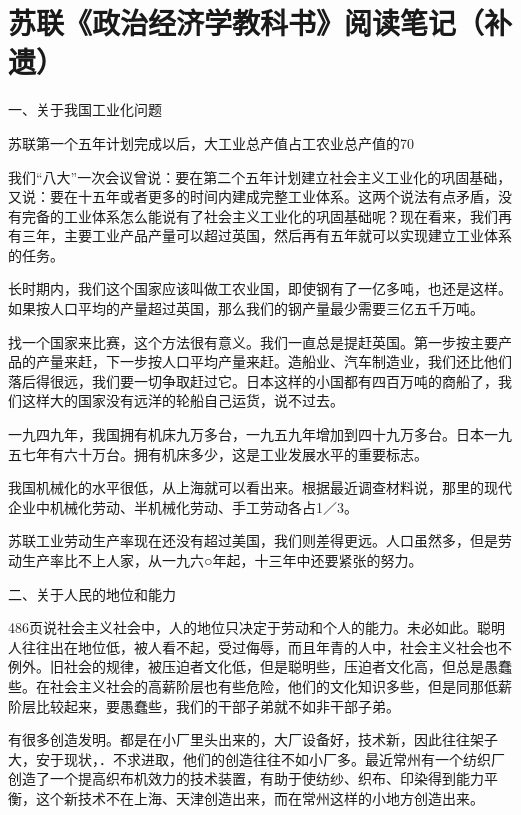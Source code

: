 \section[苏联《政治经济学教科书》阅读笔记（补遗）]{苏联《政治经济学教科书》阅读笔记（补遗）}


一、关于我国工业化问题

苏联第一个五年计划完成以后，大工业总产值占工农业总产值的70%

我们“八大”一次会议曾说：要在第二个五年计划建立社会主义工业化的巩固基础，又说：要在十五年或者更多的时间内建成完整工业体系。这两个说法有点矛盾，没有完备的工业体系怎么能说有了社会主义工业化的巩固基础呢？现在看来，我们再有三年，主要工业产品产量可以超过英国，然后再有五年就可以实现建立工业体系的任务。

长时期内，我们这个国家应该叫做工农业国，即使钢有了一亿多吨，也还是这样。如果按人口平均的产量超过英国，那么我们的钢产量最少需要三亿五千万吨。

找一个国家来比赛，这个方法很有意义。我们一直总是提赶英国。第一步按主要产品的产量来赶，下一步按人口平均产量来赶。造船业、汽车制造业，我们还比他们落后得很远，我们要一切争取赶过它。日本这样的小国都有四百万吨的商船了，我们这样大的国家没有远洋的轮船自己运货，说不过去。

一九四九年，我国拥有机床九万多台，一九五九年增加到四十九万多台。日本一九五七年有六十万台。拥有机床多少，这是工业发展水平的重要标志。

我国机械化的水平很低，从上海就可以看出来。根据最近调查材料说，那里的现代企业中机械化劳动、半机械化劳动、手工劳动各占1／3。

苏联工业劳动生产率现在还没有超过美国，我们则差得更远。人口虽然多，但是劳动生产率比不上人家，从一九六○年起，十三年中还要紧张的努力。

二、关于人民的地位和能力

486页说社会主义社会中，人的地位只决定于劳动和个人的能力。未必如此。聪明人往往出在地位低，被人看不起，受过侮辱，而且年青的人中，社会主义社会也不例外。旧社会的规律，被压迫者文化低，但是聪明些，压迫者文化高，但总是愚蠢些。在社会主义社会的高薪阶层也有些危险，他们的文化知识多些，但是同那低薪阶层比较起来，要愚蠢些，我们的干部子弟就不如非干部子弟。

有很多创造发明。都是在小厂里头出来的，大厂设备好，技术新，因此往往架子大，安于现状，．不求进取，他们的创造往往不如小厂多。最近常州有一个纺织厂创造了一个提高织布机效力的技术装置，有助于使纺纱、织布、印染得到能力平衡，这个新技术不在上海、天津创造出来，而在常州这样的小地方创造出来。

